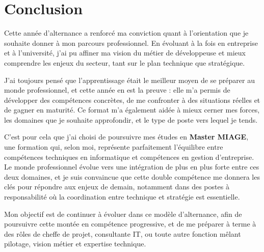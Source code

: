\section{Conclusion}
\label{conclusion}

Cette année d’alternance a renforcé ma conviction quant à l’orientation que je souhaite donner à mon parcours professionnel. En évoluant à la fois en entreprise et à l’université, j’ai pu affiner ma vision du métier de développeuse et mieux comprendre les enjeux du secteur, tant sur le plan technique que stratégique.

J’ai toujours pensé que l’apprentissage était le meilleur moyen de se préparer au monde professionnel, et cette année en est la preuve : elle m’a permis de développer des compétences concrètes, de me confronter à des situations réelles et de gagner en maturité. Ce format m’a également aidée à mieux cerner mes forces, les domaines que je souhaite approfondir, et le type de poste vers lequel je tends.

C’est pour cela que j’ai choisi de poursuivre mes études en \textbf{Master MIAGE}, une formation qui, selon moi, représente parfaitement l’équilibre entre compétences techniques en informatique et compétences en gestion d’entreprise. Le monde professionnel évolue vers une intégration de plus en plus forte entre ces deux domaines, et je suis convaincue que cette double compétence me donnera les clés pour répondre aux enjeux de demain, notamment dans des postes à responsabilité où la coordination entre technique et stratégie est essentielle.

Mon objectif est de continuer à évoluer dans ce modèle d’alternance, afin de poursuivre cette montée en compétence progressive, et de me préparer à terme à des rôles de cheffe de projet, consultante IT, ou toute autre fonction mêlant pilotage, vision métier et expertise technique.
